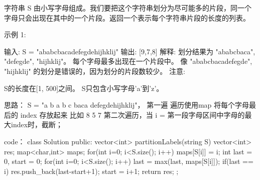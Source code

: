 字符串 S 由小写字母组成。我们要把这个字符串划分为尽可能多的片段，同一个字母只会出现在其中的一个片段。返回一个表示每个字符串片段的长度的列表。

示例 1:

输入: S = "ababcbacadefegdehijhklij"
输出: [9,7,8]
解释:
划分结果为 "ababcbaca", "defegde", "hijhklij"。
每个字母最多出现在一个片段中。
像 "ababcbacadefegde", "hijhklij" 的划分是错误的，因为划分的片段数较少。
注意:

S的长度在[1, 500]之间。
S只包含小写字母'a'到'z'。


























思路： 
 S = "a b a b c baca defegdehijhklij"， 第一遍 遍历使用map 将每个字母最后的 index 存放起来
比如  8 5     7
第二次遍历，当 i = 第一段字母区间中字母的最大index时，截断；

















code：
class Solution {
public:
    vector<int> partitionLabels(string S) {
        vector<int> res;
        map<char,int> maps;
        for(int i=0; i<S.size(); i++)
            maps[S[i]] = i;
        int last = 0, start = 0;
        for(int i=0; i<S.size(); i++)
        {
            last = max(last, maps[S[i]]);
            if(last == i)
            {
                res.push_back(last-start+1);
                start = i+1;
            }
        }
        return res;
    }
};